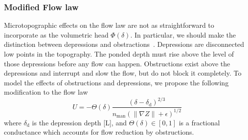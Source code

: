 \documentclass[review,11pt]{elsarticle}
\begin{document}
\subsubsection{Modified Flow law}
Microtopographic effects on the flow law are not as straightforward to incorporate as the volumetric head $\Phi(\delta)$. In particular, we should make the distinction between depressions and obstractions~\cite{panday2004fully}. Depressions are disconnected low points in the topography. The ponded depth must rise above the level of those depressions before any flow can happen. Obstructions exist above the depressions and interrupt and slow the flow, but do not block it completely.
To model the effects of obstructions and depressions, we propose the following modification to the flow law
\begin{equation}\label{modified-velocity}
U = - \Theta(\delta) \frac{(\delta - \delta_\text{d})^{2/3}}{n_\text{man} (\| \nabla Z \| +\epsilon)^{1/2}}
\end{equation}
where $\delta_\text{d}$ is the depression depth [L], and $\Theta(\delta) \in [0,1]$ is a fractional conductance which accounts for flow reduction by obstructions.

\end{document}
